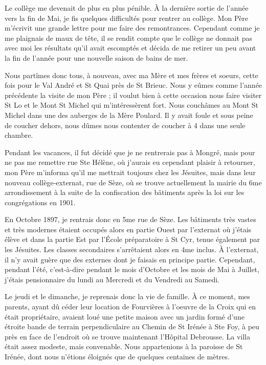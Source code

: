 \documentclass[11pt,a4paper]{report}
\begin{document}
Le collège me devenait de plus en plus pénible. À la dernière sortie de l'année vers la fin de Mai, je fis quelques difficultés pour rentrer au collège. Mon Père m'écrivit une grande lettre pour me faire des remontrances. Cependant comme je me plaignais de maux de tête, il se rendit compte que le collège ne donnait pas avec moi les résultats qu'il avait escomptés et décida de me retirer un peu avant la fin de l'année pour une nouvelle saison de bains de mer.

Nous partîmes donc tous, à nouveau, avec ma Mère et mes frères et soeurs, cette fois pour le Val André et St Quai près de St Brieuc. Nous y eûmes comme l'année précédente la visite de mon Père ; il voulut bien à cette occasion nous faire visiter St Lo et le Mont St Michel qui m'intéressèrent fort. Nous couchâmes au Mont St Michel dans une des auberges de la Mère Poulard. Il y avait foule et sous peine de coucher dehors, nous dûmes nous contenter de coucher à 4 dans une seule chambre.

Pendant les vacances, il fut décidé que je ne rentrerais pas à Mongré, mais pour ne pas me remettre rue Ste Hélène, où j'aurais eu cependant plaisir à retourner, mon Père m'informa qu'il me mettrait toujours chez les Jésuites, mais dans leur nouveau collège-externat, rue de Sèze, où se trouve actuellement la mairie du 6me arrondissement à la suite de la confiscation des bâtiments après la loi sur les congrégations en 1901.

En Octobre 1897, je rentrais donc en 5me rue de Sèze. Les bâtiments très vastes et très modernes étaient occupés alors en partie Ouest par l'externat où j'étais élève et dans la partie Est par l'École préparatoire à St Cyr, tenue également par les Jésuites. Les classes secondaires s'arrêtaient alors en 4me inclus. À l'externat, il n'y avait guère que des externes dont je faisais en principe partie. Cependant, pendant l'été, c'est-à-dire pendant le mois d'Octobre et les mois de Mai à Juillet, j'étais pensionnaire du lundi au Mercredi et du Vendredi au Samedi.

Le jeudi et le dimanche, je reprenais donc la vie de famille. À ce moment, mes parents, ayant dû céder leur location de Fourvières à l'oeuvre de la Croix qui en était propriétaire, avaient loué une petite maison avec un jardin formé d'une étroite bande de terrain perpendiculaire au Chemin de St Irénée à Ste Foy, à peu près en face de l'endroit où se trouve maintenant l'Hôpital Debrousse. La villa était assez modeste, mais convenable. Nous appartenions à la paroisse de St Irénée, dont nous n'étions éloignés que de quelques centaines de mètres.
\end{document}
